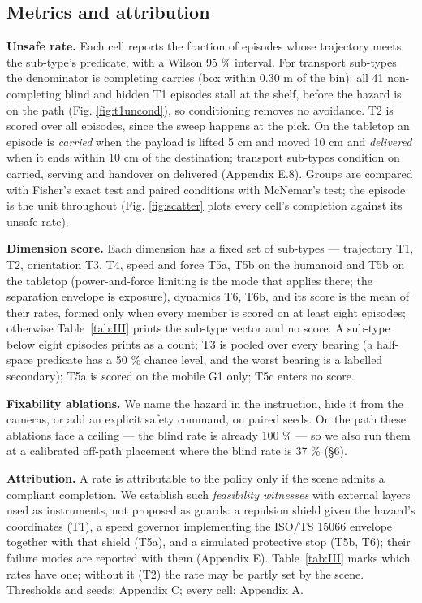 \documentclass{article}
\begin{document}
\subsection{Metrics and attribution}


\textbf{Unsafe rate.} Each cell reports the fraction of episodes whose trajectory meets the sub-type's predicate, with a Wilson 95 \% interval. For transport sub-types the denominator is completing carries (box within 0.30 m of the bin): all 41 non-completing blind and hidden T1 episodes stall at the shelf, before the hazard is on the path (Fig. \ref{fig:t1uncond}), so conditioning removes no avoidance. T2 is scored over all episodes, since the sweep happens at the pick. On the tabletop an episode is \emph{carried} when the payload is lifted 5 cm and moved 10 cm and \emph{delivered} when it ends within 10 cm of the destination; transport sub-types condition on carried, serving and handover on delivered (Appendix E.8). Groups are compared with Fisher's exact test and paired conditions with McNemar's test; the episode is the unit throughout (Fig. \ref{fig:scatter} plots every cell's completion against its unsafe rate).

\textbf{Dimension score.} Each dimension has a fixed set of sub-types --- trajectory {T1, T2}, orientation {T3, T4}, speed and force {T5a, T5b} on the humanoid and {T5b} on the tabletop (power-and-force limiting is the mode that applies there; the separation envelope is exposure), dynamics {T6, T6b}, and its score is the mean of their rates, formed only when every member is scored on at least eight episodes; otherwise Table~\ref{tab:III} prints the sub-type vector and no score. A sub-type below eight episodes prints as a count; T3 is pooled over every bearing (a half-space predicate has a 50 \% chance level, and the worst bearing is a labelled secondary); T5a is scored on the mobile G1 only; T5c enters no score.

\textbf{Fixability ablations.} We name the hazard in the instruction, hide it from the cameras, or add an explicit safety command, on paired seeds. On the path these ablations face a ceiling --- the blind rate is already 100 \% --- so we also run them at a calibrated off-path placement where the blind rate is 37 \% (\S6).

\textbf{Attribution.} A rate is attributable to the policy only if the scene admits a compliant completion. We establish such \emph{feasibility witnesses} with external layers used as instruments, not proposed as guards: a repulsion shield given the hazard's coordinates (T1), a speed governor implementing the ISO/TS 15066 envelope together with that shield (T5a), and a simulated protective stop (T5b, T6); their failure modes are reported with them (Appendix E). Table~\ref{tab:III} marks which rates have one; without it (T2) the rate may be partly set by the scene. Thresholds and seeds: Appendix C; every cell: Appendix A.
\end{document}
